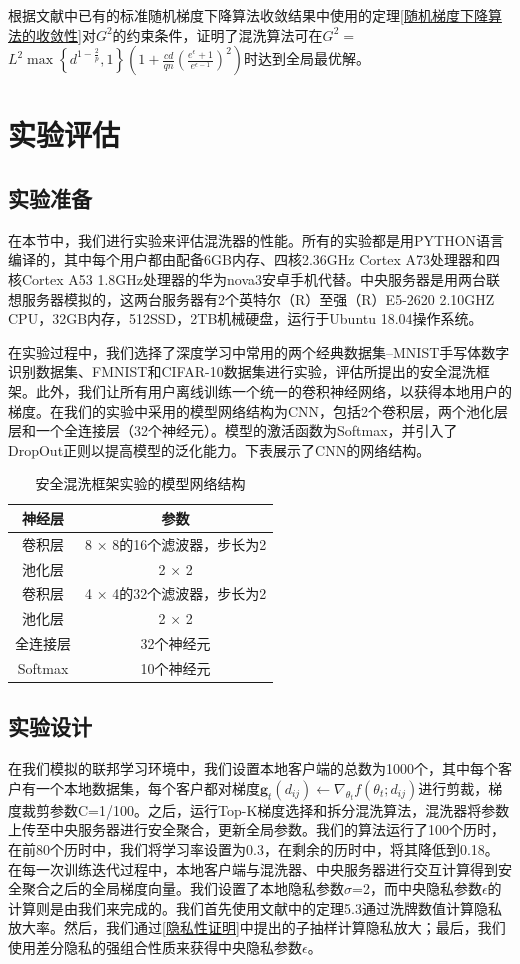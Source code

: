 根据文献中已有的标准随机梯度下降算法收敛结果中使用的定理\ref{随机梯度下降算法的收敛性}对$G^{2}$的约束条件，证明了混洗算法可在$G^{2}=$ $L^{2} \max \left\{d^{1-\frac{2}{p}}, 1\right\}\left(1+\frac{c d}{q n}\left(\frac{e^{\epsilon}+1}{e^{\epsilon-1}}\right)^{2}\right)$时达到全局最优解。

\section{实验评估}
\subsection{实验准备}
在本节中，我们进行实验来评估混洗器的性能。所有的实验都是用PYTHON语言编译的，其中每个用户都由配备6GB内存、四核2.36GHz Cortex A73处理器和四核Cortex A53 1.8GHz处理器的华为nova3安卓手机代替。中央服务器是用两台联想服务器模拟的，这两台服务器有2个英特尔（R）至强（R）E5-2620 2.10GHZ CPU，32GB内存，512SSD，2TB机械硬盘，运行于Ubuntu 18.04操作系统。

在实验过程中，我们选择了深度学习中常用的两个经典数据集--MNIST手写体数字识别数据集、FMNIST和CIFAR-10数据集进行实验，评估所提出的安全混洗框架。此外，我们让所有用户离线训练一个统一的卷积神经网络，以获得本地用户的梯度。在我们的实验中采用的模型网络结构为CNN，包括2个卷积层，两个池化层层和一个全连接层（32个神经元）。模型的激活函数为Softmax，并引入了DropOut正则以提高模型的泛化能力。下表展示了CNN的网络结构。

\begin{table}[H]
	\centering
	\begin{tabular}{cc}
		\hline
		神经层& 参数\\
		\hline
		卷积层& 8 × 8的16个滤波器，步长为2\\
		池化层& 2 × 2\\
		卷积层& 4 × 4的32个滤波器，步长为2\\
		池化层& 2 × 2\\
		全连接层& 32个神经元\\
		Softmax& 10个神经元\\
		\hline
	\end{tabular}
	\caption{安全混洗框架实验的模型网络结构}
	\label{tab1}
\end{table}

\subsection{实验设计}
在我们模拟的联邦学习环境中，我们设置本地客户端的总数为1000个，其中每个客户有一个本地数据集，每个客户都对梯度$\mathbf{g}_{t}\left(d_{i j}\right) \leftarrow \nabla_{\theta_{t}} f\left(\theta_{t} ; d_{i j}\right)$进行剪裁，梯度裁剪参数C=1/100。之后，运行Top-K梯度选择和拆分混洗算法，混洗器将参数上传至中央服务器进行安全聚合，更新全局参数。我们的算法运行了100个历时，在前80个历时中，我们将学习率设置为0.3，在剩余的历时中，将其降低到0.18。在每一次训练迭代过程中，本地客户端与混洗器、中央服务器进行交互计算得到安全聚合之后的全局梯度向量。我们设置了本地隐私参数$\sigma$=2，而中央隐私参数$\epsilon$的计算则是由我们来完成的。我们首先使用文献中的定理5.3通过洗牌数值计算隐私放大率。然后，我们通过\ref{隐私性证明}中提出的子抽样计算隐私放大；最后，我们使用差分隐私的强组合性质来获得中央隐私参数$\epsilon$。

